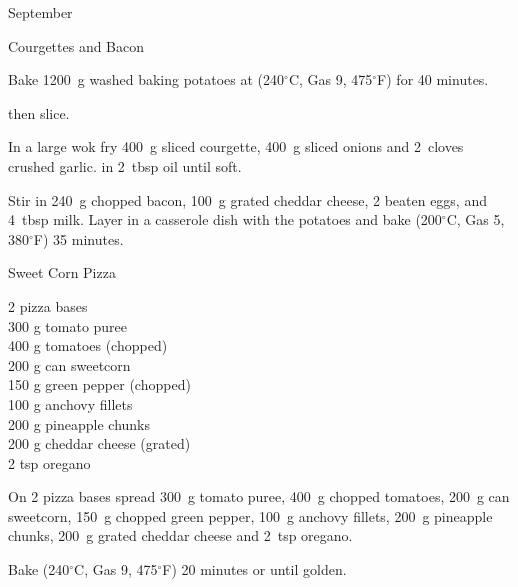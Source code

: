 \begin{menu}{September}
\begin{recipe}{2}{Courgettes and Bacon}
\begin{ingredients}
		\end{ingredients}
	
	
    \begin{instructions}
    \item 
    Bake
    1200~g washed baking potatoes
    at
    (240$^{\circ}$C, Gas 9, 475$^{\circ}$F) for 40 minutes.
  
        then slice.
      \item 
        In a large wok fry
        400~g sliced courgette,
        400~g sliced onions
        and
        2~cloves crushed garlic.
        in
        2~tbsp  oil
        until soft.
      \item 
        Stir in
        240~g chopped bacon,
        100~g grated cheddar cheese,
        2 beaten eggs,
        and
        4~tbsp  milk.
        Layer in a casserole dish
        with the potatoes
        and bake (200$^{\circ}$C, Gas 5, 380$^{\circ}$F) 35 minutes.
      
    \end{instructions}
    \end{recipe}%
  
    \begin{recipe}{2}{Sweet Corn Pizza}%
		\begin{ingredients}
		2  pizza bases  \\
	300 g tomato puree  \\
	400 g tomatoes (chopped) \\
	200 g can sweetcorn  \\
	150 g green pepper (chopped) \\
	100 g anchovy fillets  \\
	200 g pineapple chunks  \\
	200 g cheddar cheese (grated) \\
	2 tsp oregano  \\
	
		\end{ingredients}
	
	
	
    \begin{instructions}
    \item 
        On
        2  pizza bases
        spread
        300~g  tomato puree,
        400~g chopped tomatoes,
        200~g  can sweetcorn,
        150~g chopped green pepper,
        100~g  anchovy fillets,
        200~g  pineapple chunks,
        200~g grated cheddar cheese
        and
        2~tsp  oregano.
      \item 
        Bake (240$^{\circ}$C, Gas 9, 475$^{\circ}$F) 20 minutes or until golden.
      

\end{instructions}
\end{recipe}
\end{menu}
